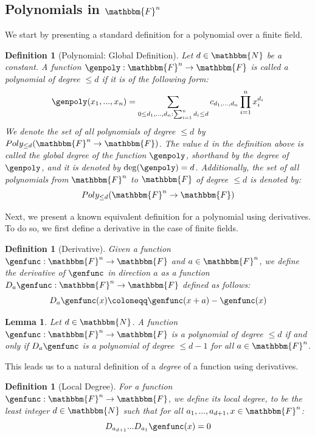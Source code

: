 \documentclass[10pt,a4paper]{article}
\newtheorem{definition}[theorem]{Definition}
\newtheorem{lemma}[theorem]{Lemma}
\newcommand{\definedas}[0]{\coloneqq}
\newcommand{\basefield}[0]{\mathbbm{F}}
\newcommand{\blocklength}[0]{n}
\newcommand{\field}[0]{\basefield^{\blocklength}}
\newcommand{\titlefield}[0]{\texorpdfstring{$\field$}{Fn}}
\newcommand{\degree}[0]{d}
\newcommand{\funcdef}[3]{#1:#2\rightarrow#3}
\newcommand{\allpolyset}[3]{Poly_{#1}(#2\rightarrow#3)}
\newcommand{\naturalnumbersset}[0]{\mathbbm{N}}
\newcommand{\directionderivative}[0]{D}
\begin{document}
\subsection[Polynomials in \titlefield]{Polynomials in \titlefield}\label{subsec:polynomials_in_Fn}
We start by presenting a standard definition for a polynomial over a finite field.
\begin{definition}[Polynomial: Global Definition]
    Let $\degree \in \naturalnumbersset$ be a constant.
    A function $\funcdef{\genpoly}{\field}{\basefield}$ is called a \emph{polynomial of degree $\leq \degree$} if
    it is of the following form:
    \[
        \genpoly(x_1,...,x_{\blocklength}) =
            \sum_{0 \leq \degree_1,...,\degree_{n} : \sum_{i=1}^{\blocklength}{\degree_i} \leq \degree}
                {c_{\degree_1,...,\degree_n} \prod_{i=1}^{\blocklength} x_i^{\degree_i}}
    \]
    We denote the set of all polynomials of degree $\leq \degree$ by $\allpolyset{\leq \degree}{\field}{\basefield}$.
    The value $\degree$ in the definition above is called the \emph{global degree} of the function $\genpoly$, shorthand by the \emph{degree} of $\genpoly$,
    and it is denoted by $\deg(\genpoly) = \degree$.
    \newline
    Additionally, the set of all polynomials from $\field$ to $\basefield$ of degree $\leq \degree$ is denoted by:
    \[
        \allpolyset{\leq \degree}{\field}{\basefield}
    \]
\end{definition}
Next, we present a known equivalent definition for a polynomial using derivatives.
To do so, we first define a derivative in the case of finite fields.
\begin{definition}[Derivative]
    Given a function $\funcdef{\genfunc}{\field}{\basefield}$ and $a \in \field$,
    we define the derivative of $\genfunc$ in direction $a$ as a function $\funcdef{\directionderivative_{a}\genfunc}{\field}{\basefield}$
    defined as follows:
    \[
        \directionderivative_a \genfunc(x) \definedas \genfunc(x + a) - \genfunc(x)
    \]
\end{definition}
\begin{lemma}
    Let $\degree \in \naturalnumbersset$.
    A function $\funcdef{\genfunc}{\field}{\basefield}$ is a polynomial of degree $\leq \degree$
    if and only if $\directionderivative_{a}\genfunc$ is a polynomial of degree $\leq \degree - 1$ for all $a \in \field$.
\end{lemma}
This leads us to a natural definition of a \emph{degree} of a function using derivatives.
\begin{definition}[Local Degree]
    For a function $\funcdef{\genfunc}{\field}{\basefield}$, we define its \emph{local degree},
    to be the least integer $\degree \in \naturalnumbersset$ such that
    for all $a_1,...,a_{\degree + 1}, x \in \field$:
    \[
        \directionderivative_{a_{\degree + 1}}...\directionderivative_{a_{1}} \genfunc(x) = 0
    \]
\end{definition}
\end{document}
